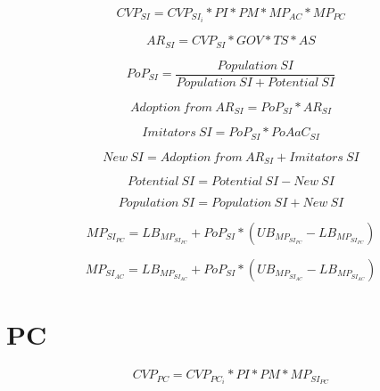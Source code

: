 \begin{equation}
		CVP_{SI} =  CVP_{SI_{i}} * PI * PM * MP_{AC} * MP_{PC}
\end{equation}

\begin{equation}
		AR_{SI} = CVP_{SI} * GOV * TS * AS		
\end{equation}

\begin{equation}
	PoP_{SI} = \frac{\mathit{Population~SI}}{\mathit{Population~SI}+\mathit{Potential~SI}}
\end{equation}

\begin{equation}
	\mathit{Adoption~from~AR_{SI}} = PoP_{SI} * AR_{SI}
\end{equation}

\begin{equation}
	\mathit{Imitators~SI} = PoP_{SI} * PoAaC_{SI}
\end{equation}

\begin{equation}
	\mathit{New~SI} = \mathit{Adoption~from~AR_{SI}} + \mathit{Imitators~SI}
\end{equation}

\begin{equation}
	\mathit{Potential~SI} = \mathit{Potential~SI} - \mathit{New~SI}
\end{equation}

\begin{equation}
	\mathit{Population~SI} = \mathit{Population~SI} + \mathit{New~SI}
\end{equation}

\begin{equation}
	MP_{SI_{PC}} = LB_{MP_{SI_{PC}}} + PoP_{SI} * (UB_{MP_{SI_{PC}}} - LB_{MP_{SI_{PC}}})
\end{equation}

\begin{equation}
	MP_{SI_{AC}} = LB_{MP_{SI_{AC}}} + PoP_{SI} * (UB_{MP_{SI_{AC}}} - LB_{MP_{SI_{AC}}})
\end{equation}

\newpage
\section{PC}

\begin{equation}
		CVP_ {PC} =  CVP_{PC_{i}} * PI * PM * MP_{SI_{PC}}
\end{equation}

